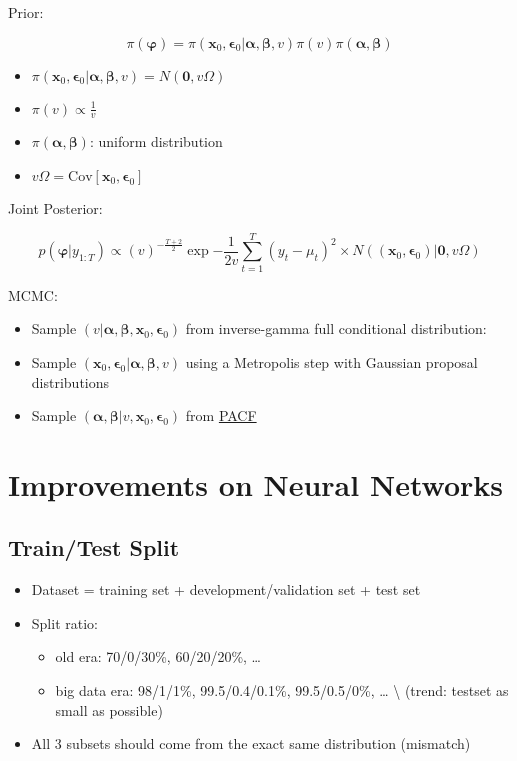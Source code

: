 \documentclass[
]{book}
\providecommand{\tightlist}{%
  \setlength{\itemsep}{0pt}\setlength{\parskip}{0pt}}
\begin{document}
Prior:

\[\begin{equation*}
        \pi(\bm{\varphi})=\pi(\bm{x}_0,\bm{\epsilon}_0|\bm{\alpha},\bm{\beta},v)\pi(v)\pi(\bm{\alpha},\bm{\beta})
    \end{equation*}\]

\begin{itemize}
\tightlist
\item
  \(\pi(\bm{x}_0,\bm{\epsilon}_0|\bm{\alpha},\bm{\beta},v)=N(\bm{0},v\Omega)\)
\item
  \(\pi(v)\propto\frac{1}{v}\)
\item
  \(\pi(\bm{\alpha},\bm{\beta})\): uniform distribution
\item
  \(v\Omega=\text{Cov}[\bm{x}_0,\bm{\epsilon}_0]\)
\end{itemize}

Joint Posterior:

\[\begin{equation*}
        p(\bm{\varphi}|y_{1:T})\propto (v)^{-\frac{T+2}{2}}\exp{-\frac{1}{2v}\sum_{t=1}^T{(y_t-\mu_t)^2}}\times N((\bm{x}_0,\bm{\epsilon}_0)|\bm{0},v\Omega)
    \end{equation*}\]

MCMC:

\begin{itemize}
\tightlist
\item
  Sample \((v|\bm{\alpha},\bm{\beta},\bm{x}_0,\bm{\epsilon}_0)\) from
  inverse-gamma full conditional distribution:
\item
  Sample \((\bm{x}_0,\bm{\epsilon}_0|\bm{\alpha},\bm{\beta},v)\) using a
  Metropolis step with Gaussian proposal distributions
\item
  Sample \((\bm{\alpha},\bm{\beta}|v,\bm{x}_0,\bm{\epsilon}_0)\) from
  \hyperlink{PACF}{PACF}
\end{itemize}

\hypertarget{imp}{%
\chapter{Improvements on Neural Networks}\label{imp}}

\hypertarget{traintest-split}{%
\section{Train/Test Split}\label{traintest-split}}

\begin{itemize}
\tightlist
\item
  Dataset = training set + development/validation set + test set
\item
  Split ratio:

  \begin{itemize}
  \tightlist
  \item
    old era: 70/0/30\%, 60/20/20\%, \ldots{}
  \item
    big data era: 98/1/1\%, 99.5/0.4/0.1\%, 99.5/0.5/0\%, \ldots{}
    \textbackslash{} (trend: testset as small as possible)
  \end{itemize}
\item
  All 3 subsets should come from the exact same distribution (mismatch)
\end{itemize}
\end{document}
